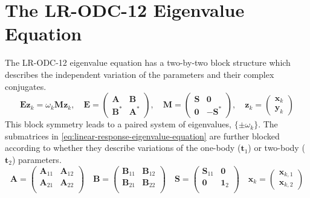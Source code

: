 \section{The LR-ODC-12 Eigenvalue Equation}
\label{sec:davidson:eig}

The LR-ODC-12 eigenvalue equation has a two-by-two block structure which
describes the independent variation of the parameters and their complex
conjugates.
\begin{equation}
    \label{eq:linear-response-eigenvalue-equation}
    \mathbf{E}\mathbf{z}_k
    =
    \omega_k
    \mathbf{M}\mathbf{z}_k
    ,
    \quad
    \mathbf{E}
    =
    \begin{pmatrix}
        \mathbf{A} & \mathbf{B} \\
        \mathbf{B}^* & \mathbf{A}^*
    \end{pmatrix}
    ,
    \quad
    \mathbf{M}
    =
    \begin{pmatrix}
        \mathbf{S} & \mathbf{0} \\
        \mathbf{0} & -\mathbf{S}^*
    \end{pmatrix}
    ,
    \quad
    \mathbf{z}_k
    =
    \begin{pmatrix}
        \mathbf{x}_k \\
        \mathbf{y}_k
    \end{pmatrix}
\end{equation}
This block symmetry leads to a paired system of eigenvalues,
\(
    \{\pm\omega_k\}
\).
The submatrices in \cref{eq:linear-response-eigenvalue-equation} are further
blocked according to whether they describe variations of the one-body
(\(\mathbf{t}_1\)) or two-body (\(\mathbf{t}_2\)) parameters.
\begin{equation}
    \label{eq:conjugate-blocks}
    \mathbf{A}
    =
    \begin{pmatrix}
        \mathbf{A}_{11} & \mathbf{A}_{12} \\
        \mathbf{A}_{21} & \mathbf{A}_{22} \\
    \end{pmatrix}
    \quad
    \mathbf{B}
    =
    \begin{pmatrix}
        \mathbf{B}_{11} & \mathbf{B}_{12} \\
        \mathbf{B}_{21} & \mathbf{B}_{22} \\
    \end{pmatrix}
    \quad
    \mathbf{S}
    =
    \begin{pmatrix}
        \mathbf{S}_{11} & \mathbf{0} \\
        \mathbf{0} & \mathbf{1}_2 \\
    \end{pmatrix}
    \quad
    \mathbf{x}_k
    =
    \begin{pmatrix}
        \mathbf{x}_{k,1} \\
        \mathbf{x}_{k,2}
    \end{pmatrix}
\end{equation}
